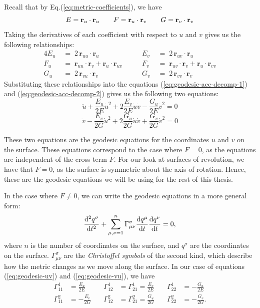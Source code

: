 \documentclass[12pt]{article}
\begin{document}
Recall that by Eq.(\ref{eq:metric-coefficients}), we have
\[
	E = \mathbf{r}_{u} \cdot \mathbf{r}_{u}  \qquad F = \mathbf{r}_{u} \cdot \mathbf{r}_{v} \qquad G = \mathbf{r}_{v} \cdot \mathbf{r}_{v}\\
\]
Taking the derivatives of each coefficient with respect to $u$ and $v$ gives us the following relationships:
\begin{alignat*}{4}
E_{u} \; &=\; 2\,\mathbf{r}_{uu}\cdot \mathbf{r}_{u} \quad &\quad E_{v} \; &=\; 2\,\mathbf{r}_{uv}\cdot \mathbf{r}_{u}\\[5pt]
F_{u} \; &=\; \mathbf{r}_{uu}\cdot \mathbf{r}_{v} + \mathbf{r}_{u}\cdot \mathbf{r}_{uv} \quad &\quad F_{v} \; &=\; \mathbf{r}_{uv}\cdot \mathbf{r}_{v} + \mathbf{r}_{u}\cdot \mathbf{r}_{vv}\\[5pt]
G_{u} \; &=\; 2\,\mathbf{r}_{vu}\cdot \mathbf{r}_{v} \quad &\quad G_{v} \; &=\; 2\,\mathbf{r}_{vv}\cdot \mathbf{r}_{v}
\end{alignat*}
Substituting these relationships into the equations (\ref{eq:geodesic-acc-decomp-1}) and (\ref{eq:geodesic-acc-decomp-2}) gives us the following two equations:
\begin{equation}\label{eq:geodesic-uv}
	\ddot{u} + \frac{E_{u}}{2E}\dot{u}^{2} + 2\frac{E_{v}}{2E}\dot{u}\dot{v} - \frac{G_{u}}{2E}\dot{v}^{2} = 0
\end{equation}
\begin{equation}\label{eq:geodesic-vu}
	\ddot{v} - \frac{E_{v}}{2G}\dot{u}^{2} + 2\frac{G_{u}}{2G}\dot{u}\dot{v} + \frac{G_{v}}{2G}\dot{v}^{2} = 0
\end{equation}

These two equations are the geodesic equations for the coordinates \(u\) and \(v\) on the surface.
These equations correspond to the case where $F = 0$, as the equations are independent of the cross term $F$.
For our look at surfaces of revolution, we have that $F = 0$, as the surface is symmetric about the axis of rotation.
Hence, these are the geodesic equations we will be using for the rest of this thesis.

In the case where $F \neq 0$, we can write the geodesic equations in a more general form:
\begin{equation}\label{eq:geodesic-compact}
	\dv[2]{q^\sigma}{t} + \sum_{\mu,\nu=1}^{n} \Gamma_{\mu\nu}^\sigma \dv{q^\mu}{t} \dv{q^\nu}{t} = 0,
\end{equation}
where $n$ is the number of coordinates on the surface, and $q^\sigma$ are the coordinates on the surface.
$\Gamma_{\mu\nu}^\sigma$ are the \emph{Christoffel symbols} of the second kind, which describe how the metric changes as we move along the surface.
In our case of equations (\ref{eq:geodesic-uv}) and (\ref{eq:geodesic-vu}), we have
\[
\begin{aligned}
    \Gamma_{11}^{1} &= \frac{E_{u}}{2E} &\quad \Gamma_{12}^{1} &= \Gamma_{21}^{1} = \frac{E_{v}}{2E} &\quad \Gamma_{22}^{1} &= -\frac{G_{u}}{2E} \\[4mm]
    \Gamma_{11}^{2} &= -\frac{E_{v}}{2G} &\quad \Gamma_{12}^{2} &= \Gamma_{21}^{2} = \frac{G_{u}}{2G} &\quad \Gamma_{22}^{2} &= -\frac{G_{v}}{2G}.
\end{aligned}
\]
\end{document}
